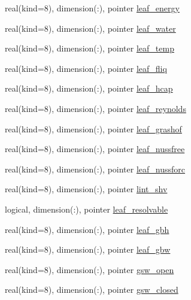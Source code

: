 \begin{DoxyCompactItemize}
\item 
real(kind=8), dimension(\+:), pointer \hyperlink{structrk4__coms_1_1rk4patchtype_a17317c5e60e602315c8b7c56b05e1964}{leaf\+\_\+energy}
\item 
real(kind=8), dimension(\+:), pointer \hyperlink{structrk4__coms_1_1rk4patchtype_a10a247485df7f1c5b486f23cb6003047}{leaf\+\_\+water}
\item 
real(kind=8), dimension(\+:), pointer \hyperlink{structrk4__coms_1_1rk4patchtype_a24e0440a32934e2435c683331aa9dfd0}{leaf\+\_\+temp}
\item 
real(kind=8), dimension(\+:), pointer \hyperlink{structrk4__coms_1_1rk4patchtype_a56ed71eb0acbe8799f3f186fd11fb1fa}{leaf\+\_\+fliq}
\item 
real(kind=8), dimension(\+:), pointer \hyperlink{structrk4__coms_1_1rk4patchtype_a556a73c67228c675acbd763a5834f3d8}{leaf\+\_\+hcap}
\item 
real(kind=8), dimension(\+:), pointer \hyperlink{structrk4__coms_1_1rk4patchtype_ad5dd19ca41b23dab8d14eae4fb0af934}{leaf\+\_\+reynolds}
\item 
real(kind=8), dimension(\+:), pointer \hyperlink{structrk4__coms_1_1rk4patchtype_a6a78347d27675bfc5366591606d24bcc}{leaf\+\_\+grashof}
\item 
real(kind=8), dimension(\+:), pointer \hyperlink{structrk4__coms_1_1rk4patchtype_ae6318e64b32f345c28e0e79d3b16303d}{leaf\+\_\+nussfree}
\item 
real(kind=8), dimension(\+:), pointer \hyperlink{structrk4__coms_1_1rk4patchtype_a80327efac81fcdba16df9f1bae0479a4}{leaf\+\_\+nussforc}
\item 
real(kind=8), dimension(\+:), pointer \hyperlink{structrk4__coms_1_1rk4patchtype_a62668870091098724f56e4c97d9d3544}{lint\+\_\+shv}
\item 
logical, dimension(\+:), pointer \hyperlink{structrk4__coms_1_1rk4patchtype_aa5ef99d0f4268a71d536bb72bb229495}{leaf\+\_\+resolvable}
\item 
real(kind=8), dimension(\+:), pointer \hyperlink{structrk4__coms_1_1rk4patchtype_aef6e74337280506d5c60ef35ea02c19e}{leaf\+\_\+gbh}
\item 
real(kind=8), dimension(\+:), pointer \hyperlink{structrk4__coms_1_1rk4patchtype_a6c35e5bcc047f599987390aa6d3efb5f}{leaf\+\_\+gbw}
\item 
real(kind=8), dimension(\+:), pointer \hyperlink{structrk4__coms_1_1rk4patchtype_a8f30e2c10f2ce2ce6e32836e36ad9186}{gsw\+\_\+open}
\item 
real(kind=8), dimension(\+:), pointer \hyperlink{structrk4__coms_1_1rk4patchtype_a8060c979e9978fafbb4d9f2db03cc812}{gsw\+\_\+closed}

\end{DoxyCompactItemize}
